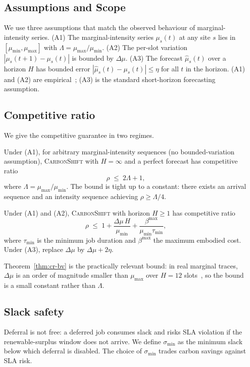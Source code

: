 \subsection{Assumptions and Scope}
We use three assumptions that match the observed behaviour of marginal-intensity series. (A1) The marginal-intensity series $\mu_s(t)$ at any site $s$ lies in $[\mu_{\min},\mu_{\max}]$ with $\Lambda = \mu_{\max}/\mu_{\min}$. (A2) The per-slot variation $|\mu_s(t+1)-\mu_s(t)|$ is bounded by $\Delta\mu$. (A3) The forecast $\hat\mu_s(t)$ over a horizon $H$ has bounded error $|\hat\mu_s(t)-\mu_s(t)|\le\eta$ for all $t$ in the horizon. (A1) and (A2) are empirical~\cite{chen2024towards,sukprasert2024implications}; (A3) is the standard short-horizon forecasting assumption.

\subsection{Competitive ratio}
We give the competitive guarantee in two regimes.

\begin{theorem}
\label{thm:cr}
Under (A1), for arbitrary marginal-intensity sequences (no bounded-variation assumption), \textsc{CarbonShift} with $H=\infty$ and a perfect forecast has competitive ratio
\[
\rho \;\le\; 2\Lambda + 1,
\]
where $\Lambda = \mu_{\max}/\mu_{\min}$. The bound is tight up to a constant: there exists an arrival sequence and an intensity sequence achieving $\rho\ge\Lambda/4$.
\end{theorem}

\begin{theorem}
\label{thm:cr-bv}
Under (A1) and (A2), \textsc{CarbonShift} with horizon $H\ge 1$ has competitive ratio
\[
\rho \;\le\; 1 + \frac{\Delta\mu\,H}{\mu_{\min}} + \frac{\beta^{\max}}{\mu_{\min}\tau_{\min}},
\]
where $\tau_{\min}$ is the minimum job duration and $\beta^{\max}$ the maximum embodied cost. Under (A3), replace $\Delta\mu$ by $\Delta\mu+2\eta$.
\end{theorem}

Theorem~\ref{thm:cr-bv} is the practically relevant bound: in real marginal traces, $\Delta\mu$ is an order of magnitude smaller than $\mu_{\max}$ over $H=12$ slots~\cite{chen2024towards}, so the bound is a small constant rather than $\Lambda$.

\subsection{Slack safety}
Deferral is not free: a deferred job consumes slack and risks SLA violation if the renewable-surplus window does not arrive. We define $\sigma_{\min}$ as the minimum slack below which deferral is disabled. The choice of $\sigma_{\min}$ trades carbon savings against SLA risk.

